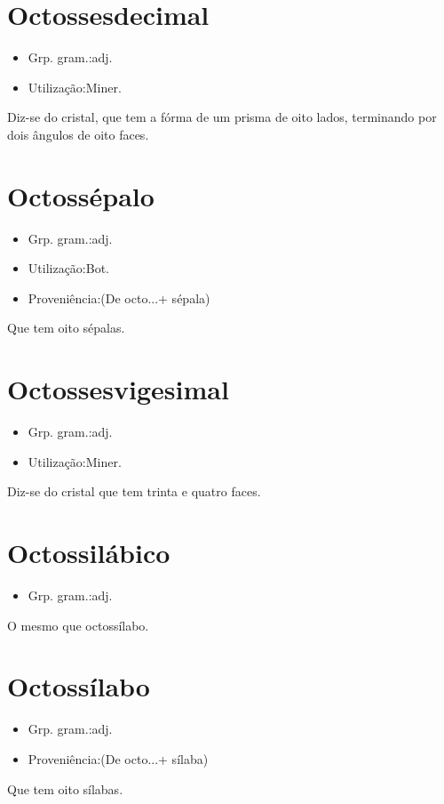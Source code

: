 \section{Octossesdecimal}
\begin{itemize}
\item {Grp. gram.:adj.}
\end{itemize}
\begin{itemize}
\item {Utilização:Miner.}
\end{itemize}
Diz-se do cristal, que tem a fórma de um prisma de oito lados, terminando por dois ângulos de oito faces.
\section{Octossépalo}
\begin{itemize}
\item {Grp. gram.:adj.}
\end{itemize}
\begin{itemize}
\item {Utilização:Bot.}
\end{itemize}
\begin{itemize}
\item {Proveniência:(De \textunderscore octo...\textunderscore  + \textunderscore sépala\textunderscore )}
\end{itemize}
Que tem oito sépalas.
\section{Octossesvigesimal}
\begin{itemize}
\item {Grp. gram.:adj.}
\end{itemize}
\begin{itemize}
\item {Utilização:Miner.}
\end{itemize}
Diz-se do cristal que tem trinta e quatro faces.
\section{Octossilábico}
\begin{itemize}
\item {Grp. gram.:adj.}
\end{itemize}
O mesmo que \textunderscore octossílabo\textunderscore .
\section{Octossílabo}
\begin{itemize}
\item {Grp. gram.:adj.}
\end{itemize}
\begin{itemize}
\item {Proveniência:(De \textunderscore octo...\textunderscore  + \textunderscore sílaba\textunderscore )}
\end{itemize}
Que tem oito sílabas.
